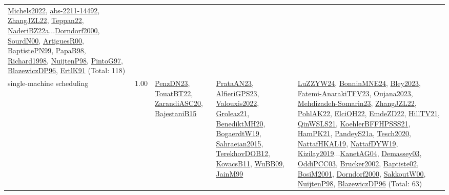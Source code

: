 {\begin{longtable}{p{3cm}r>{\raggedright\arraybackslash}p{6cm}>{\raggedright\arraybackslash}p{6cm}>{\raggedright\arraybackslash}p{8cm}}
\hyperref[detail:Michels2022]{Michels2022}, \hyperref[detail:abs-2211-14492]{abs-2211-14492}, \hyperref[detail:ZhangJZL22]{ZhangJZL22}, \hyperref[detail:Teppan22]{Teppan22}, \hyperref[detail:NaderiBZ22a]{NaderiBZ22a}...\hyperref[detail:Dorndorf2000]{Dorndorf2000}, \hyperref[detail:SourdN00]{SourdN00}, \hyperref[detail:ArtiguesR00]{ArtiguesR00}, \hyperref[detail:BaptistePN99]{BaptistePN99}, \hyperref[detail:PapaB98]{PapaB98}, \hyperref[detail:Richard1998]{Richard1998}, \hyperref[detail:NuijtenP98]{NuijtenP98}, \hyperref[detail:PintoG97]{PintoG97}, \hyperref[detail:BlazewiczDP96]{BlazewiczDP96}, \hyperref[detail:ErtlK91]{ErtlK91} (Total: 118)\\
\index{single-machine scheduling}\index{Concepts!single-machine scheduling}single-machine scheduling &  1.00 & \hyperref[detail:PenzDN23]{PenzDN23}, \hyperref[detail:TouatBT22]{TouatBT22}, \hyperref[detail:ZarandiASC20]{ZarandiASC20}, \hyperref[detail:BajestaniB15]{BajestaniB15} & \hyperref[detail:PrataAN23]{PrataAN23}, \hyperref[detail:AlfieriGPS23]{AlfieriGPS23}, \hyperref[detail:Valouxis2022]{Valouxis2022}, \hyperref[detail:Groleaz21]{Groleaz21}, \hyperref[detail:BenediktMH20]{BenediktMH20}, \hyperref[detail:BogaerdtW19]{BogaerdtW19}, \hyperref[detail:Sahraeian2015]{Sahraeian2015}, \hyperref[detail:TerekhovDOB12]{TerekhovDOB12}, \hyperref[detail:KovacsB11]{KovacsB11}, \hyperref[detail:WuBB09]{WuBB09}, \hyperref[detail:JainM99]{JainM99} & \hyperref[detail:LuZZYW24]{LuZZYW24}, \hyperref[detail:BonninMNE24]{BonninMNE24}, \hyperref[detail:Bley2023]{Bley2023}, \hyperref[detail:Fatemi-AnarakiTFV23]{Fatemi-AnarakiTFV23}, \hyperref[detail:Oujana2023]{Oujana2023}, \hyperref[detail:Mehdizadeh-Somarin23]{Mehdizadeh-Somarin23}, \hyperref[detail:ZhangJZL22]{ZhangJZL22}, \hyperref[detail:PohlAK22]{PohlAK22}, \hyperref[detail:ElciOH22]{ElciOH22}, \hyperref[detail:EmdeZD22]{EmdeZD22}, \hyperref[detail:HillTV21]{HillTV21}, \hyperref[detail:QinWSLS21]{QinWSLS21}, \hyperref[detail:KoehlerBFFHPSSS21]{KoehlerBFFHPSSS21}, \hyperref[detail:HamPK21]{HamPK21}, \hyperref[detail:PandeyS21a]{PandeyS21a}, \hyperref[detail:Tesch2020]{Tesch2020}, \hyperref[detail:NattafHKAL19]{NattafHKAL19}, \hyperref[detail:NattafDYW19]{NattafDYW19}, \hyperref[detail:Kizilay2019]{Kizilay2019}...\hyperref[detail:KanetAG04]{KanetAG04}, \hyperref[detail:Demassey03]{Demassey03}, \hyperref[detail:OddiPCC03]{OddiPCC03}, \hyperref[detail:Brucker2002]{Brucker2002}, \hyperref[detail:Baptiste02]{Baptiste02}, \hyperref[detail:BosiM2001]{BosiM2001}, \hyperref[detail:Dorndorf2000]{Dorndorf2000}, \hyperref[detail:SakkoutW00]{SakkoutW00}, \hyperref[detail:NuijtenP98]{NuijtenP98}, \hyperref[detail:BlazewiczDP96]{BlazewiczDP96} (Total: 63)\\

\end{longtable}}

